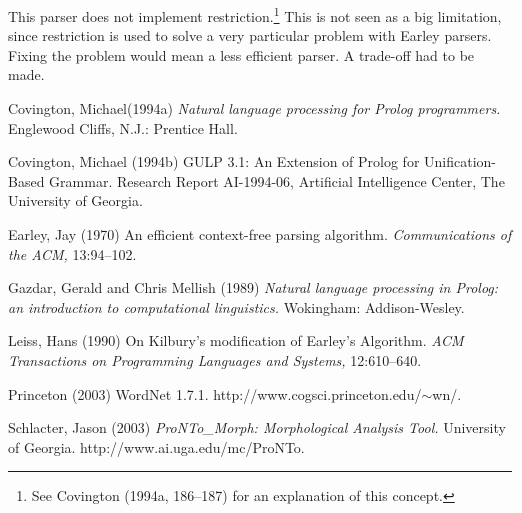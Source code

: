 \documentclass[12pt]{article}
\begin{document}
This parser does not implement restriction.\footnote{ See Covington (1994a, 186--187) for an explanation of this concept.}  This is not seen as a big limitation, since restriction is used to solve a very particular problem with Earley parsers.  Fixing the problem would mean a less efficient parser.  A trade-off had to be made.

\begin{thebibliography}{}
\frenchspacing
\raggedright

\item[Covington, Michael(1994a)]
\emph{Natural language processing for Prolog programmers.}
Englewood Cliffs, N.J.: Prentice Hall.

\item[Covington, Michael (1994b)]
GULP 3.1:  An Extension of Prolog for Unification-Based Grammar.
Research Report AI-1994-06, Artificial Intelligence Center, The University of Georgia.

\item[Earley, Jay (1970)]
An efficient context-free parsing algorithm. \emph{Communications of the ACM,} 13:94--102.

\item[Gazdar, Gerald and Chris Mellish (1989)]
\emph{Natural language processing in Prolog: an introduction to computational linguistics.} Wokingham: Addison-Wesley.

\item[Leiss, Hans (1990)]
On Kilbury's modification of Earley's Algorithm. \emph{ACM Transactions on Programming Languages and Systems,} 12:610--640.

\item[Princeton (2003)]
WordNet 1.7.1.
http://www.cogsci.princeton.edu/$\sim$wn/.

\item[Schlacter, Jason (2003)]
\emph{ProNTo\_Morph: Morphological Analysis Tool.} University of Georgia. http://www.ai.uga.edu/mc/ProNTo.

\end{thebibliography}
\end{document}
